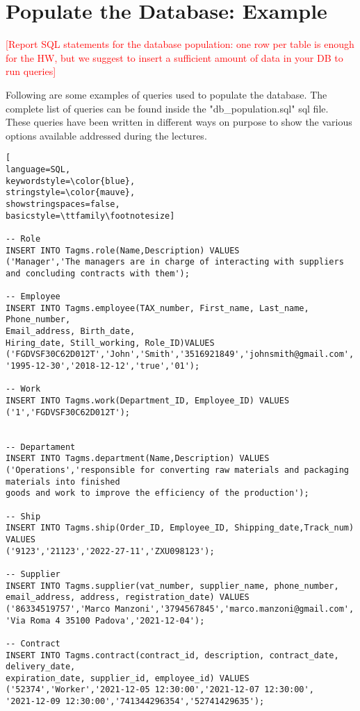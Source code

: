 
\section{Populate the Database: Example}
\textcolor{red}{[Report SQL statements for the database population: one row per table is enough for the HW, but we suggest to insert a sufficient amount of data in your DB to run queries]}

Following are some examples of queries used to populate the database. The complete list of queries can be found inside the "db_population.sql" sql file. These queries have been written in different ways on purpose to show the various options available addressed during the lectures.

\begin{lstlisting}[
language=SQL,
keywordstyle=\color{blue},
stringstyle=\color{mauve},
showstringspaces=false,
basicstyle=\ttfamily\footnotesize]

-- Role
INSERT INTO Tagms.role(Name,Description) VALUES 
('Manager','The managers are in charge of interacting with suppliers
and concluding contracts with them');

-- Employee
INSERT INTO Tagms.employee(TAX_number, First_name, Last_name, Phone_number,
Email_address, Birth_date,
Hiring_date, Still_working, Role_ID)VALUES
('FGDVSF30C62D012T','John','Smith','3516921849','johnsmith@gmail.com',
'1995-12-30','2018-12-12','true','01');

-- Work
INSERT INTO Tagms.work(Department_ID, Employee_ID) VALUES 
('1','FGDVSF30C62D012T');


-- Departament
INSERT INTO Tagms.department(Name,Description) VALUES
('Operations','responsible for converting raw materials and packaging materials into finished
goods and work to improve the efficiency of the production');

-- Ship
INSERT INTO Tagms.ship(Order_ID, Employee_ID, Shipping_date,Track_num) VALUES 
('9123','21123','2022-27-11','ZXU098123');

-- Supplier
INSERT INTO Tagms.supplier(vat_number, supplier_name, phone_number, 
email_address, address, registration_date) VALUES
('86334519757','Marco Manzoni','3794567845','marco.manzoni@gmail.com',
'Via Roma 4 35100 Padova','2021-12-04');

-- Contract
INSERT INTO Tagms.contract(contract_id, description, contract_date, delivery_date, 
expiration_date, supplier_id, employee_id) VALUES 
('52374','Worker','2021-12-05 12:30:00','2021-12-07 12:30:00',
'2021-12-09 12:30:00','741344296354','52741429635');


\end{lstlisting}
